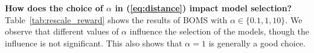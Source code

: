 \renewcommand{\arraystretch}{0.9}
\begin{table}[!h]
\caption{Normalized regrets under vanilla RAMBO and BOMS-augmented RAMBO. }
\label{tab:rambo_regrets}
\begin{adjustbox}{center}
\end{adjustbox}
\end{table}

\noindent\textbf{How does the choice of $\alpha$ in (\ref{eq:distance}) impact model selection?} Table~\ref{tab:rescale_reward} shows the results of BOMS with $\alpha \in \{0.1, 1, 10\}$. We observe that different values of $\alpha$ influence the selection of the models, though the influence is not significant. This also shows that $\alpha = 1$ is generally a good choice.




